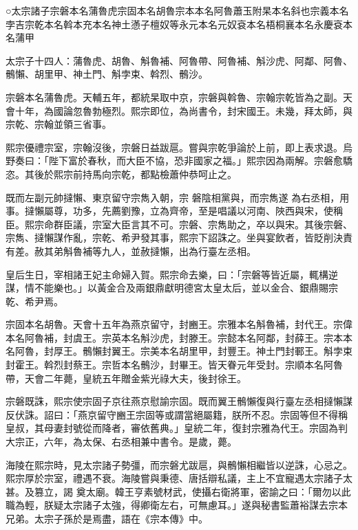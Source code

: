 
\begin{pinyinscope}

 ○太宗諸子宗磐本名蒲魯虎宗固本名胡魯宗本本名阿魯蕭玉附杲本名斜也宗義本名孛吉宗乾本名斡本充本名神土懣子檀奴等永元本名元奴袞本名梧桐襄本名永慶袞本名蒲甲



 太宗子十四人：蒲魯虎、胡魯、斛魯補、阿魯帶、阿魯補、斛沙虎、阿鄰、阿魯、鶻懶、胡里甲、神土門、斛孛束、斡烈、鶻沙。



 宗磐本名蒲魯虎。天輔五年，都統杲取中京，宗磐與斡魯、宗翰宗乾皆為之副。天會十年，為國論忽魯勃極烈。熙宗即位，為尚書令，封宋國王。未幾，拜太師，與宗乾、宗翰並領三省事。



 熙宗優禮宗室，宗翰沒後，宗磐日益跋扈。嘗與宗乾爭論於上前，即上表求退。烏野奏曰：「陛下富於春秋，而大臣不協，恐非國家之福。」熙宗因為兩解。宗磐愈驕恣。其後於熙宗前持馬向宗乾，都點檢蕭仲恭呵止之。



 既而左副元帥撻懶、東京留守宗雋入朝，宗
 磐陰相黨與，而宗雋遂
 為右丞相，用事。撻懶屬尊，功多，先薦劉豫，立為齊帝，至是唱議以河南、陜西與宋，使稱臣。熙宗命群臣議，宗室大臣言其不可。宗磐、宗雋助之，卒以與宋。其後宗磐、宗雋、撻懶謀作亂，宗乾、希尹發其事，熙宗下詔誅之。坐與宴飲者，皆貶削決責有差。赦其弟斛魯補等九人，並赦撻懶，出為行臺左丞相。



 皇后生日，宰相諸王妃主命婦入賀。熙宗命去樂，曰：「宗磐等皆近屬，輒構逆謀，情不能樂也。」以黃金合及兩銀鼎獻明德宮太皇太后，並以金合、銀鼎賜宗乾、希尹焉。



 宗固本名胡魯。天會十五年為燕京留守，封豳王。宗雅本名斛魯補，封代王。宗偉本名阿魯補，封虞王。宗英本名斛沙虎，封滕王。宗懿本名阿鄰，封薛王。宗本本名阿魯，封厚王。鶻懶封翼王。宗美本名胡里甲，封豐王。神土門封鄆王。斛孛束封霍王。斡烈封蔡王。宗哲本名鶻沙，封畢王。皆天眷元年受封。宗順本名阿魯帶，天會二年薨，皇統五年贈金紫光祿大夫，後封徐王。



 宗磐既誅，熙宗使宗固子京往燕京慰諭宗固。既而翼王鶻懶復與行臺左丞相撻懶謀反伏誅。詔曰：「燕京留守豳王宗固等或謂當絕屬籍，朕所不忍。宗固等但不得稱皇叔，其母妻封號從而降者，審依舊典。」皇統二年，復封宗雅為代王。宗固為判大宗正，六年，為太保、右丞相兼中書令。是歲，薨。



 海陵在熙宗時，見太宗諸子勢彊，而宗磐尤跋扈，與鶻懶相繼皆以逆誅，心忌之。熙宗厚於宗室，禮遇不衰。海陵嘗與秉德、唐括辯私議，主上不宜寵遇太宗諸子太甚。及篡立，謁
 奠太廟。韓王亨素號材武，使攝右衛將軍，密諭之曰：「爾勿以此職為輕，朕疑太宗諸子太強，得卿衛左右，可無慮耳。」遂與秘書監蕭裕謀去宗本兄弟。太宗子孫於是焉盡，語在《宗本傳》中。




\end{pinyinscope}
